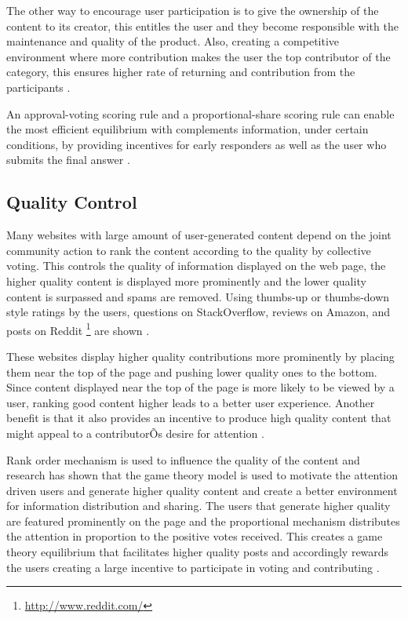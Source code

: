 The other way to encourage user participation is to give the ownership of the content to its creator, this entitles the user and they become responsible with the maintenance and quality of the product. Also, creating a competitive environment where more contribution makes the user the top contributor of the category, this ensures higher rate of returning and contribution from the participants \cite{singh2009motivating}.

An approval-voting scoring rule and a proportional-share scoring rule can enable the most efficient equilibrium with complements information, under certain conditions, by providing incentives for early responders as well as the user who submits the final answer \cite{jain2009designing}.



\subsection{Quality Control}

Many websites with large amount of user-generated content depend on the joint community action to rank the content according to the quality by collective voting. This controls the quality of information displayed on the web page, the higher quality content is displayed more prominently and the lower quality content is surpassed and spams are removed. Using thumbs-up or thumbs-down style ratings by the users, questions on StackOverflow, reviews on Amazon, and posts on Reddit \footnote{\url{http://www.reddit.com/}} are shown \cite{kleinberg1999authoritative}.

These websites display higher quality contributions more prominently by placing them near the top of the page and pushing lower quality ones to the bottom. Since content displayed near the top of the page is more likely to be viewed by a user, ranking good content higher leads to a better user experience. Another benefit is that it also provides an incentive to produce high quality content that might appeal to a contributorÕs desire for attention \cite{jain2009role}.

Rank order mechanism is used to influence the quality of the content and research has shown that the game theory model is used to motivate the attention driven users and generate higher quality content and create a better environment for information distribution and sharing. The users that generate higher quality are featured prominently on the page and the proportional mechanism distributes the attention in proportion to the positive votes received. This creates a game theory equilibrium that facilitates higher quality posts and accordingly rewards the users creating a large incentive to participate in voting and contributing \cite{ghosh2011game}.

